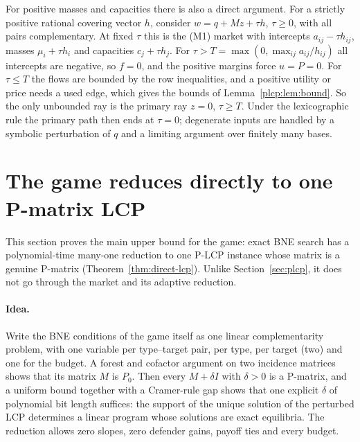 \begin{remark}\label{plcp:rem:noray}
For positive masses and capacities there is also a direct argument. For a strictly positive rational
covering vector $h$, consider $w=q+Mz+\tau h$, $\tau\ge0$, with all pairs complementary. At fixed $\tau$
this is the (M1) market with intercepts $a_{ij}-\tau h_{ij}$, masses $\mu_i+\tau h_i$ and capacities
$c_j+\tau h_j$. For $\tau>T=\max(0,\max_{ij}a_{ij}/h_{ij})$ all intercepts are negative, so $f=0$, and the
positive margins force $u=P=0$. For $\tau\le T$ the flows are bounded by the row inequalities, and a
positive utility or price needs a used edge, which gives the bounds of Lemma~\ref{plcp:lem:bound}. So the
only unbounded ray is the primary ray $z=0$, $\tau\ge T$. Under the lexicographic rule the primary path
then ends at $\tau=0$; degenerate inputs are handled by a symbolic perturbation of $q$ and a limiting
argument over finitely many bases.
\end{remark}

\section{The game reduces directly to one P-matrix LCP}\label{sec:direct-lcp}

This section proves the main upper bound for the game: exact BNE search has a polynomial-time many-one reduction to one P-LCP instance whose matrix is a genuine P-matrix (Theorem~\ref{thm:direct-lcp}). Unlike Section~\ref{sec:plcp}, it does not go through the market and its adaptive reduction.

\paragraph{Idea.} Write the BNE conditions of the game itself as one linear complementarity problem,
with one variable per type--target pair, per type, per target (two) and one for the budget. A forest and
cofactor argument on two incidence matrices shows that its matrix $M$ is $P_0$. Then every $M+\delta I$
with $\delta>0$ is a P-matrix, and a uniform bound together with a Cramer-rule gap shows that one
explicit $\delta$ of polynomial bit length suffices: the support of the unique solution of the
perturbed LCP determines a linear program whose solutions are exact equilibria. The reduction allows zero
slopes, zero defender gains, payoff ties and every budget.

